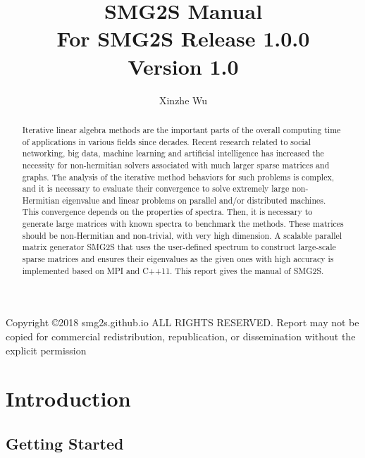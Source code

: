 \documentclass[a4paper, 10 pt]{report}
\title{{\Huge SMG2S Manual}\\
	\vspace{1cm}
	\large {For SMG2S Release 1.0.0} \\
	\vspace{2cm}
	\Large	Version 1.0\\}
\author{
	\Large Xinzhe Wu\\
}
\begin{document}
	\maketitle
	\pagestyle{empty}
	Copyright \copyright 2018 smg2s.github.io ALL RIGHTS RESERVED.
	Report may not be copied for commercial redistribution, republication, or dissemination without the explicit permission
	
	\begin{abstract}
	Iterative linear algebra methods are the important parts of the overall computing time of applications in various fields since decades. Recent research related to social networking, big data, machine learning and artificial intelligence has increased the necessity for non-hermitian solvers associated with much larger sparse matrices and graphs. The analysis of the iterative method behaviors for such problems is complex, and it is necessary to evaluate their convergence to solve extremely large non-Hermitian eigenvalue and linear problems on parallel and/or distributed machines. This convergence depends on the properties of spectra. Then, it is necessary to generate large matrices with known spectra to benchmark the methods. These matrices should be non-Hermitian and non-trivial, with very high dimension. A scalable parallel matrix generator SMG2S that uses the user-defined spectrum to construct large-scale sparse matrices and ensures their eigenvalues as the given ones with high accuracy is implemented based on MPI and C++11. This report gives the manual of SMG2S.
	\end{abstract}
	\newpage
	\thispagestyle{empty}
	\mbox{}
	\tableofcontents
	\newpage
	\thispagestyle{empty}
	\mbox{}
	
	\pagestyle{myheadings}
	
	\chapter{Introduction}
	
	\section{Getting Started}
\end{document}
